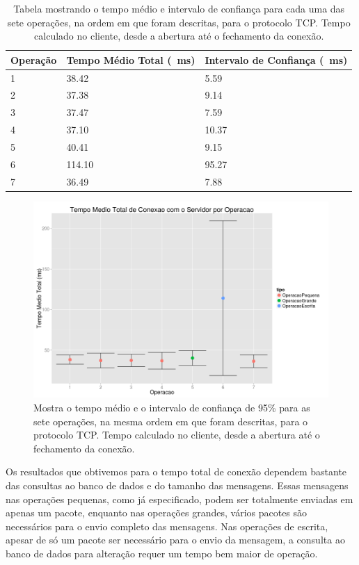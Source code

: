 \documentclass[12pt,a4paper]{article}
\begin{document}
\begin{table}[h]
\centering
\caption{Tabela mostrando o tempo médio e intervalo de confiança para cada uma das sete operações, na ordem em que foram descritas, para o protocolo TCP. Tempo calculado no cliente, desde a abertura até o fechamento da conexão.}
\label{table:totalT}
\begin{tabular}{lll}
Operação & Tempo Médio Total (\SI{}{\milli\second}) & Intervalo de Confiança (\SI{}{\milli\second})\\ \hline
1        & 38.42           & 5.59   \\
2        & 37.38           & 9.14   \\
3        & 37.47           & 7.59   \\
4        & 37.10           & 10.37  \\
5        & 40.41           & 9.15   \\
6        & 114.10          & 95.27  \\
7        & 36.49           & 7.88  
\end{tabular}
\end{table}

\begin{figure}[h]
\centering
\includegraphics[width=\textwidth]{diagrama/resultadosTempoTotal.png}
\caption{Mostra o tempo médio e o intervalo de confiança de 95\% para as sete operações, na mesma ordem em que foram descritas, para o protocolo TCP. Tempo calculado no cliente, desde a abertura até o fechamento da conexão.}
\label{fig:totalT}
\end{figure}

Os resultados que obtivemos para o tempo total de conexão dependem bastante das consultas ao banco de dados e do tamanho das mensagens. Essas mensagens nas operações pequenas, como já especificado, podem ser totalmente enviadas em apenas um pacote, enquanto nas operações grandes, vários pacotes são necessários para o envio completo das mensagens. Nas operações de escrita, apesar de só um pacote ser necessário para o envio da mensagem, a consulta ao banco de dados para alteração requer um tempo bem maior de operação.
\end{document}
